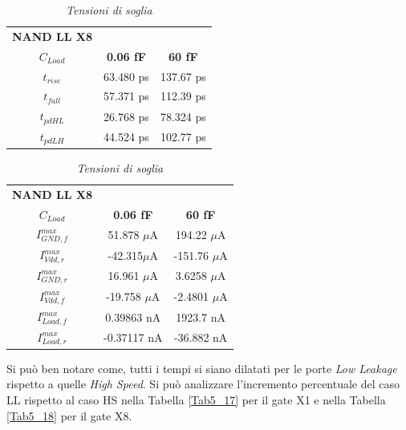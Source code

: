 \begin{table}[!h]\footnotesize
	\centering
	\begin{tabular}{|c|c|c|}
		\hline
		\textbf{NAND LL X8} & &\\
		\textbf{$C_{Load}$} & \textbf{0.06 fF} & \textbf{60 fF}\\
		\hline
		$t_{rise}$ &63.480 ps&137.67 ps  \\
		
		$t_{fall}$ &57.371 ps &112.39 ps  \\
		
		$t_{pdHL}$&26.768 ps &78.324 ps  \\
		
		$t_{pdLH}$ &44.524 ps&102.77 ps  \\
		\hline
	\end{tabular}
	\caption{\textit{Tensioni di soglia}}
	\label{Tab5_15}
\end{table}
\begin{table}[!h]\footnotesize
	\centering
	\begin{tabular}{|c|c|c|}
		\hline
		\textbf{NAND LL X8} & &\\
		\textbf{$C_{Load}$} & \textbf{0.06 fF} & \textbf{60 fF}\\
		\hline
		$I_{GND, f}^{max}$ &51.878 $\mu$A &194.22 $\mu$A\\
		
		$I_{Vdd, r}^{max}$ &-42.315$\mu$A &-151.76 $\mu$A \\
		
		$I_{GND, r}^{max}$&16.961 $\mu$A &3.6258 $\mu$A\\
		
		$I_{Vdd, f}^{max}$&-19.758 $\mu$A&-2.4801 $\mu$A \\
		
		$I_{Load, f}^{max}$ &0.39863 nA &1923.7 nA \\
		
		$I_{Load, r}^{max}$ &-0.37117 nA &-36.882 nA  \\
		\hline
	\end{tabular}
	\caption{\textit{Tensioni di soglia}}
	\label{Tab5_16}
\end{table}
Si può ben notare come, tutti i tempi si siano dilatati per le porte \textit{Low Leakage} rispetto a quelle \textit{High Speed}. Si può analizzare l'incremento percentuale del caso LL rispetto al caso HS nella Tabella \ref{Tab5_17} per il gate X1 e nella Tabella \ref{Tab5_18} per il gate X8.
